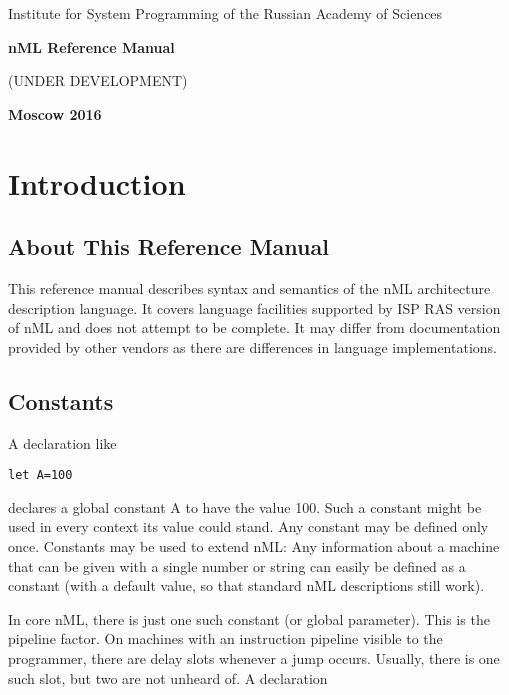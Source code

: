 \documentclass[oneside,final,14pt]{extreport}
\begin{document}
\begin{titlepage}
\begin{center}
\Large{Institute for System Programming of the Russian Academy of Sciences}

\vfill


\bf\Large{nML Reference Manual}

(UNDER DEVELOPMENT)

\vfill

\bf
Moscow 2016
\end{center}


\end{titlepage}

\newpage
{} %
\tableofcontents

\newpage


\chapter{Introduction}

\section{About This Reference Manual}

This reference manual describes syntax and semantics of the nML architecture
description language. It covers language facilities supported by ISP RAS
version of nML and does not attempt to be complete. It may differ from
documentation provided by other vendors as there are differences in
language implementations.

\section{Constants}

A declaration like

\begin{lstlisting}
let A=100
\end{lstlisting}

declares a global constant A to have the value 100. Such a constant might be used in every context
its value could stand. Any constant may be defined only once. Constants may be used to extend nML:
Any information about a machine that can be given with a single number or string can easily be
defined as a constant (with a default value, so that standard nML descriptions still work).

In core nML, there is just one such constant (or global parameter).
This is the pipeline factor. On machines with an instruction pipeline visible to the programmer,
there are delay slots whenever a jump occurs. Usually, there is one such slot, but two are not
unheard of. A declaration
\end{document}
